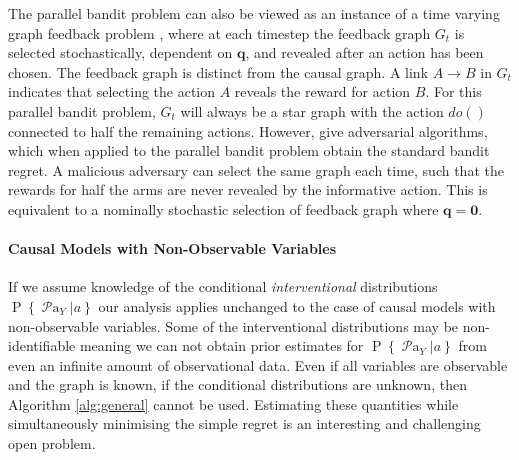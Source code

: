 \documentclass{article}
\newcommand{\Pn}[2]{\operatorname{P}\left\{#2|#1\right\}}
\newcommand{\parents}[1]{\operatorname{\mathcal{P}a}_{#1}}
\theoremstyle{plain}
\theoremstyle{definition}
\begin{document}

The parallel bandit problem can also be viewed as an instance of a time varying graph feedback problem \citep{Alon2015,Kocak2014}, where at each timestep the feedback graph $G_t$ is selected stochastically, dependent on $\boldsymbol{q}$, and revealed after an action has been chosen. The feedback graph is distinct from the causal graph. A link $A \rightarrow B$ in $G_t$ indicates that selecting the action $A$ reveals the reward for action $B$. For this parallel bandit problem, $G_t$ will always be a star graph with the action $do()$ connected to half the remaining actions. However, \citet{Alon2015,Kocak2014} give adversarial algorithms, which when applied to the parallel bandit problem obtain the standard bandit regret. A malicious adversary can select the same graph each time, such that the rewards for half the arms are never revealed by the informative action. This is equivalent to a nominally stochastic selection of feedback graph where $\boldsymbol{q} = \boldsymbol{0}$. 



\vspace{-0.4cm} 
\paragraph{Causal Models with Non-Observable Variables}
If we assume knowledge of the conditional \textit{interventional} distributions $\Pn{a}{\parents{Y}}$ our analysis applies unchanged to the case of causal models with 
non-observable variables. Some of the interventional distributions may be non-identifiable meaning we can not obtain prior estimates for $\Pn{a}{\parents{Y}}$ from 
even an infinite amount of observational data. Even if all variables are observable and the graph is known, if the conditional distributions are unknown, then Algorithm
\ref{alg:general} cannot be used. Estimating these quantities while simultaneously minimising the simple regret is an interesting and challenging open problem.
\end{document}
